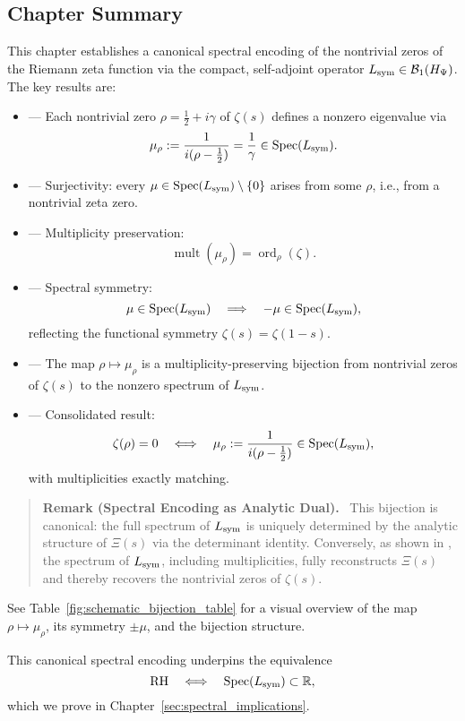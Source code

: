 \subsection*{Chapter Summary}

This chapter establishes a canonical spectral encoding of the nontrivial zeros of the Riemann zeta function via the compact, self-adjoint operator \( L_{\mathrm{sym}} \in \mathcal{B}_1(H_{\Psi}) \). The key results are:

\begin{itemize}
  \item {} — Each nontrivial zero \( \rho = \tfrac{1}{2} + i\gamma \) of \( \zeta(s) \) defines a nonzero eigenvalue via
  \[
  \mu_\rho := \frac{1}{i(\rho - \tfrac{1}{2})} = \frac{1}{\gamma} \in \operatorname{Spec}(L_{\mathrm{sym}}).
  \]

  \item {} — Surjectivity: every \( \mu \in \operatorname{Spec}(L_{\mathrm{sym}}) \setminus \{0\} \) arises from some \( \rho \), i.e., from a nontrivial zeta zero.

  \item {} — Multiplicity preservation:
  \[
  \operatorname{mult}(\mu_\rho) = \operatorname{ord}_\rho(\zeta).
  \]

  \item {} — Spectral symmetry:
  \[
  \mu \in \operatorname{Spec}(L_{\mathrm{sym}}) \quad \Longrightarrow \quad -\mu \in \operatorname{Spec}(L_{\mathrm{sym}}),
  \]
  reflecting the functional symmetry \( \zeta(s) = \zeta(1 - s) \).

  \item {} — The map \( \rho \mapsto \mu_\rho \) is a multiplicity-preserving bijection from nontrivial zeros of \( \zeta(s) \) to the nonzero spectrum of \( L_{\mathrm{sym}} \).

  \item {} — Consolidated result:
  \[
  \zeta(\rho) = 0 \quad \Longleftrightarrow \quad \mu_\rho := \frac{1}{i(\rho - \tfrac{1}{2})} \in \operatorname{Spec}(L_{\mathrm{sym}}),
  \]
  with multiplicities exactly matching.
\end{itemize}

\begin{quote}
  \textbf{Remark (Spectral Encoding as Analytic Dual).}~
  This bijection is canonical: the full spectrum of \( L_{\mathrm{sym}} \) is uniquely determined by the analytic structure of \( \Xi(s) \) via the determinant identity. Conversely, as shown in , the spectrum of \( L_{\mathrm{sym}} \), including multiplicities, fully reconstructs \( \Xi(s) \) and thereby recovers the nontrivial zeros of \( \zeta(s) \).
\end{quote}

See Table~\ref{fig:schematic_bijection_table} for a visual overview of the map \( \rho \mapsto \mu_\rho \), its symmetry \( \pm\mu \), and the bijection structure.

\medskip

This canonical spectral encoding underpins the equivalence
\[
\mathrm{RH} \quad \Longleftrightarrow \quad \operatorname{Spec}(L_{\mathrm{sym}}) \subset \mathbb{R},
\]
which we prove in Chapter~\ref{sec:spectral_implications}.
